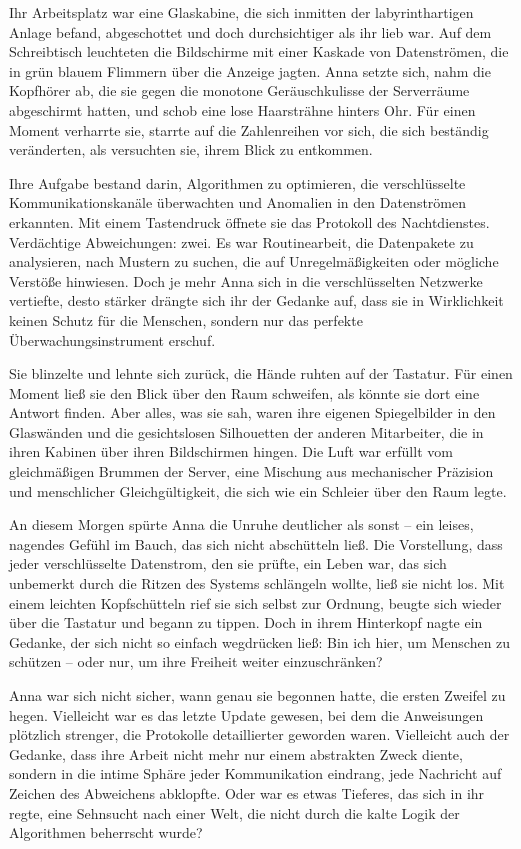 \documentclass[
]{article}
\begin{document}
Ihr Arbeitsplatz war eine Glaskabine, die sich inmitten der
labyrinthartigen Anlage befand, abgeschottet und doch durchsichtiger als
ihr lieb war. Auf dem Schreibtisch leuchteten die Bildschirme mit einer
Kaskade von Datenströmen, die in grün blauem Flimmern über die Anzeige
jagten. Anna setzte sich, nahm die Kopfhörer ab, die sie gegen die
monotone Geräuschkulisse der Serverräume abgeschirmt hatten, und schob
eine lose Haarsträhne hinters Ohr. Für einen Moment verharrte sie,
starrte auf die Zahlenreihen vor sich, die sich beständig veränderten,
als versuchten sie, ihrem Blick zu entkommen.

Ihre Aufgabe bestand darin, Algorithmen zu optimieren, die
verschlüsselte Kommunikationskanäle überwachten und Anomalien in den
Datenströmen erkannten. Mit einem Tastendruck öffnete sie das Protokoll
des Nachtdienstes. Verdächtige Abweichungen: zwei. Es war Routinearbeit,
die Datenpakete zu analysieren, nach Mustern zu suchen, die auf
Unregelmäßigkeiten oder mögliche Verstöße hinwiesen. Doch je mehr Anna
sich in die verschlüsselten Netzwerke vertiefte, desto stärker drängte
sich ihr der Gedanke auf, dass sie in Wirklichkeit keinen Schutz für die
Menschen, sondern nur das perfekte Überwachungsinstrument erschuf.

Sie blinzelte und lehnte sich zurück, die Hände ruhten auf der Tastatur.
Für einen Moment ließ sie den Blick über den Raum schweifen, als könnte
sie dort eine Antwort finden. Aber alles, was sie sah, waren ihre
eigenen Spiegelbilder in den Glaswänden und die gesichtslosen
Silhouetten der anderen Mitarbeiter, die in ihren Kabinen über ihren
Bildschirmen hingen. Die Luft war erfüllt vom gleichmäßigen Brummen der
Server, eine Mischung aus mechanischer Präzision und menschlicher
Gleichgültigkeit, die sich wie ein Schleier über den Raum legte.

An diesem Morgen spürte Anna die Unruhe deutlicher als sonst -- ein
leises, nagendes Gefühl im Bauch, das sich nicht abschütteln ließ. Die
Vorstellung, dass jeder verschlüsselte Datenstrom, den sie prüfte, ein
Leben war, das sich unbemerkt durch die Ritzen des Systems schlängeln
wollte, ließ sie nicht los. Mit einem leichten Kopfschütteln rief sie
sich selbst zur Ordnung, beugte sich wieder über die Tastatur und begann
zu tippen. Doch in ihrem Hinterkopf nagte ein Gedanke, der sich nicht so
einfach wegdrücken ließ: Bin ich hier, um Menschen zu schützen -- oder
nur, um ihre Freiheit weiter einzuschränken?

Anna war sich nicht sicher, wann genau sie begonnen hatte, die ersten
Zweifel zu hegen. Vielleicht war es das letzte Update gewesen, bei dem
die Anweisungen plötzlich strenger, die Protokolle detaillierter
geworden waren. Vielleicht auch der Gedanke, dass ihre Arbeit nicht mehr
nur einem abstrakten Zweck diente, sondern in die intime Sphäre jeder
Kommunikation eindrang, jede Nachricht auf Zeichen des Abweichens
abklopfte. Oder war es etwas Tieferes, das sich in ihr regte, eine
Sehnsucht nach einer Welt, die nicht durch die kalte Logik der
Algorithmen beherrscht wurde?
\end{document}
